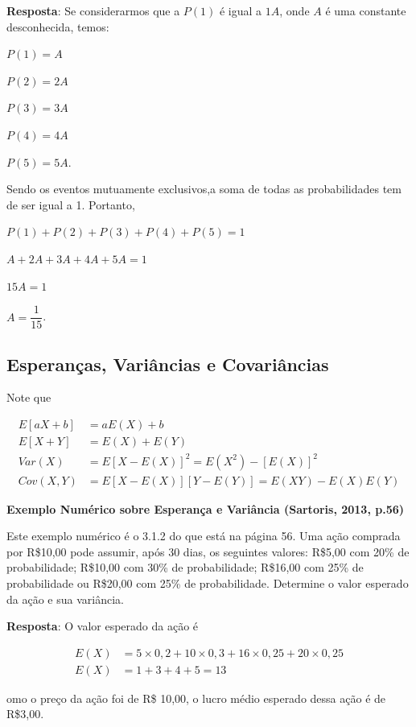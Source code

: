 \documentclass[
]{book}
\begin{document}
\textbf{Resposta}: Se considerarmos que a \(P(1)\) é igual a \(1A\), onde \(A\) é uma constante desconhecida, temos:

\(P(1)=A\)

\(P(2)=2A\)

\(P(3)=3A\)

\(P(4)=4A\)

\(P(5)=5A\).

Sendo os eventos mutuamente exclusivos,a soma de todas as probabilidades tem de ser igual a 1. Portanto,

\(P(1) + P(2) + P(3) + P(4) + P(5) = 1\)

\(A + 2A + 3A + 4A + 5A = 1\)

\(15A = 1\)

\(A = \dfrac{1}{15}\).

\hypertarget{esperanuxe7as-variuxe2ncias-e-covariuxe2ncias}{%
\subsection{Esperanças, Variâncias e Covariâncias}\label{esperanuxe7as-variuxe2ncias-e-covariuxe2ncias}}

Note que

\begin{align}
  E[aX + b] &= aE(X) + b \\
  E[X + Y] &= E(X) + E(Y) \\
  Var(X) &= E[X - E(X)]^2 = E(X^2) - [E(X)]^2 \\
  Cov(X,Y) &= E[X - E(X)][Y - E(Y)] = E(XY) - E(X)E(Y)
\end{align}

\textbf{Exemplo Numérico sobre Esperança e Variância (Sartoris, 2013, p.56)}

Este exemplo numérico é o 3.1.2 do \citet{Sartoris2013} que está na página 56.
Uma ação comprada por R\$10,00 pode assumir, após 30 dias, os seguintes valores:
R\$5,00 com 20\% de probabilidade; R\$10,00 com 30\% de probabilidade; R\$16,00 com 25\% de probabilidade ou R\$20,00 com 25\% de probabilidade. Determine o valor esperado da ação e sua variância.

\textbf{Resposta}: O valor esperado da ação é

\begin{align}
  E(X) &= 5 \times 0,2 + 10 \times 0,3 + 16 \times 0,25 + 20 \times 0,25 \\
  E(X) &= 1 + 3 + 4 + 5 = 13
\end{align}

omo o preço da ação foi de R\$ 10,00, o lucro médio esperado dessa ação é de R\$3,00.
\end{document}
